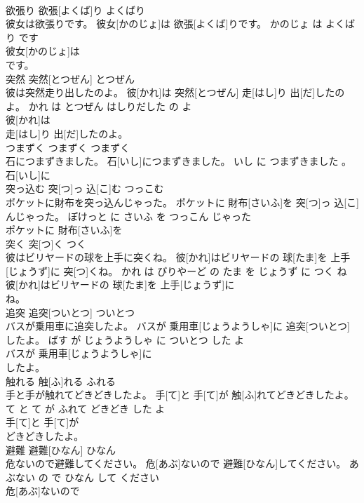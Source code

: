 \documentclass[8pt]{extreport}
\begin{document}
\begin{CJK}{UTF8}{min}
\\	欲張り	欲張[よくば]り	よくばり	
\\	彼女は欲張りです。	彼女[かのじょ]は 欲張[よくば]りです。	かのじょ は よくばり です	
\\	彼女[かのじょ]は
\\	です。			
\\	突然	突然[とつぜん]	とつぜん	
\\	彼は突然走り出したのよ。	彼[かれ]は 突然[とつぜん] 走[はし]り 出[だ]したのよ。	かれ は とつぜん はしりだした の よ	
\\	彼[かれ]は
\\	走[はし]り 出[だ]したのよ。			
\\	つまずく	つまずく	つまずく	
\\	石につまずきました。	石[いし]につまずきました。	いし に つまずきました 。	
\\	石[いし]に
\\	突っ込む	突[つ]っ 込[こ]む	つっこむ	
\\	ポケットに財布を突っ込んじゃった。	ポケットに 財布[さいふ]を 突[つ]っ 込[こ]んじゃった。	ぽけっと に さいふ を つっこん じゃった	
\\	ポケットに 財布[さいふ]を
\\	突く	突[つ]く	つく	
\\	彼はビリヤードの球を上手に突くね。	彼[かれ]はビリヤードの 球[たま]を 上手[じょうず]に 突[つ]くね。	かれ は びりやーど の たま を じょうず に つく ね	
\\	彼[かれ]はビリヤードの 球[たま]を 上手[じょうず]に
\\	ね。			
\\	追突	追突[ついとつ]	ついとつ	
\\	バスが乗用車に追突したよ。	バスが 乗用車[じょうようしゃ]に 追突[ついとつ]したよ。	ばす が じょうようしゃ に ついとつ した よ	
\\	バスが 乗用車[じょうようしゃ]に
\\	したよ。			
\\	触れる	触[ふ]れる	ふれる	
\\	手と手が触れてどきどきしたよ。	手[て]と 手[て]が 触[ふ]れてどきどきしたよ。	て と て が ふれて どきどき した よ	
\\	手[て]と 手[て]が
\\	どきどきしたよ。			
\\	避難	避難[ひなん]	ひなん	
\\	危ないので避難してください。	危[あぶ]ないので 避難[ひなん]してください。	あぶない の で ひなん して ください	
\\	危[あぶ]ないので

\end{CJK}
\end{document}
